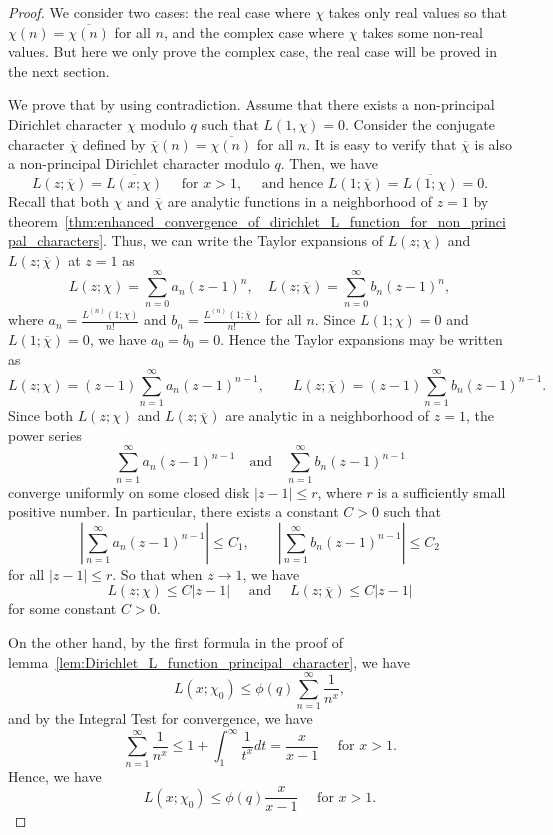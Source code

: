 \documentclass{elegantbook}
\begin{document}
\begin{proof}
  We consider two cases: the real case where \(\chi\) takes only real values so that \( \chi(n) = \overline{\chi(n)} \) for all \(n\), and the complex case where \(\chi\) takes some non-real values. But here we only prove the complex case, the real case will be proved in the next section.

  We prove that by using contradiction. Assume that there exists a non-principal Dirichlet character \(\chi\) modulo \(q\) such that \(L(1,\chi) = 0\). Consider the conjugate character \(\overline{\chi}\) defined by \(\overline{\chi}(n) = \overline{\chi(n)}\) for all \(n\). It is easy to verify that \(\overline{\chi}\) is also a non-principal Dirichlet character modulo \(q\). Then, we have
  \[
    L(z;\overline{\chi}) = \overline{L(x;\chi)} \quad \text{ for } x > 1, \quad \text{ and hence } L(1;\overline{\chi}) = \overline{L(1;\chi)} = 0.
  \]
  Recall that both \(\chi\) and \(\overline{\chi}\) are analytic functions in a neighborhood of \(z=1\) by theorem~\ref{thm:enhanced_convergence_of_dirichlet_L_function_for_non_principal_characters}. 
  Thus, we can write the Taylor expansions of \(L(z;\chi)\) and \(L(z;\overline{\chi})\) at \(z=1\) as
  \[
    L(z;\chi) = \sum_{n=0}^{\infty} a_n (z-1)^n, \quad L(z;\overline{\chi}) = \sum_{n=0}^{\infty} b_n (z-1)^n,
  \]
  where \(a_n = \frac{L^{(n)}(1;\chi)}{n!}\) and \(b_n = \frac{L^{(n)}(1;\overline{\chi})}{n!}\) for all \(n\). 
  Since $L(1;\chi)=0$ and $L(1;\overline{\chi})=0$, we have $a_0=b_0=0$. Hence the Taylor expansions may be written as
  \[
    L(z;\chi) = (z-1)\sum_{n=1}^{\infty} a_n (z-1)^{n-1}, \qquad L(z;\overline{\chi}) = (z-1)\sum_{n=1}^{\infty} b_n (z-1)^{n-1}.
  \]
  Since both $L(z;\chi)$ and $L(z;\overline{\chi})$ are analytic in a neighborhood of $z=1$, the power series
  \[
    \sum_{n=1}^{\infty} a_n (z-1)^{n-1} \quad \text{and} \quad \sum_{n=1}^{\infty} b_n (z-1)^{n-1}
  \]
  converge uniformly on some closed disk $|z-1|\le r$, where $r$ is a sufficiently small positive number. In particular, there exists a constant $C>0$ such that
  \[
    \left|\sum_{n=1}^{\infty} a_n (z-1)^{n-1}\right|\le C_1, \qquad \left|\sum_{n=1}^{\infty} b_n (z-1)^{n-1}\right|\le C_2
  \]
  for all $|z-1|\le r$. 
  So that when $z\to 1$, we have
  \[
    L(z;\chi) \leq C|z-1| \quad \text{ and } \quad L(z;\overline{\chi}) \leq C|z-1|
  \]
  for some constant \(C > 0\). 
  
  On the other hand, by the first formula in the proof of lemma~\ref{lem:Dirichlet_L_function_principal_character}, we have
  \[
    L(x;\chi_0) \leq \phi(q)\sum_{n=1}^{\infty} \frac{1}{n^x},
  \]
  and by the Integral Test for convergence, we have
  \[
    \sum_{n=1}^{\infty} \frac{1}{n^x} \leq 1 + \int_1^{\infty} \frac{1}{t^x} dt = \frac{x}{x-1} \quad \text{ for } x > 1.
  \]
  Hence, we have
  \[
    L(x;\chi_0) \leq \phi(q) \frac{x}{x-1} \quad \text{ for } x > 1.
  \]


\end{proof}
\end{document}
